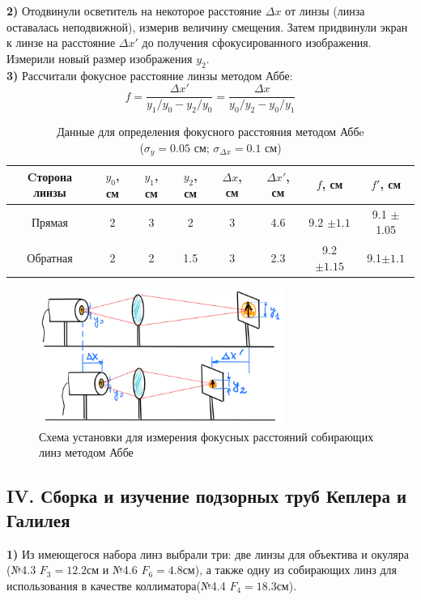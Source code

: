 \textbf{2)} Отодвинули осветитель на некоторое расстояние ${\Delta x}$ от линзы (линза оставалась неподвижной), измерив величину смещения. Затем придвинули экран к линзе на расстояние ${\Delta x'}$ до получения сфокусированного изображения. Измерили новый размер изображения ${y_2}$. \\

\textbf{3)} Рассчитали фокусное расстояние линзы методом Аббе:
\begin{equation}
    f = \frac{\Delta x'}{y_1 / y_0 - y_2 / y_0} = \frac{\Delta x}{y_0 / y_2 - y_0 / y_1}
\end{equation}

\begin{table}[h!]
    \centering
    \begin{tabular}{|c|c|c|c|c|c|c|c|}
        \hline
        Cторона линзы & $y_0$, см & $y_1$, см & $y_2$, см & $\Delta x$, см & $\Delta x'$, см & $f$, см & $f'$, см \\\hline
        Прямая   & 2 & 3 & 2   & 3 & 4.6 & 9.2 $\pm 1.1$ & 9.1 $\pm$ 1.05\\\hline
        Обратная & 2 & 2 & 1.5 & 3 & 2.3 & 9.2 $\pm 1.15$ & 9.1$\pm 1.1$ \\\hline
    \end{tabular}
    \caption{Данные для определения фокусного расстояния методом Аббe\\($\sigma_y = 0.05$ см; $\sigma_{\Delta{x}} = 0.1$ см)}
\end{table}



\begin{figure}[h!]
    \centering
    \includegraphics[width=8cm]{images/setup3.png}
    \caption{Схема установки для измерения фокусных расстояний собирающих линз методом Аббе}
\end{figure}

\subsection*{IV. Сборка и изучение подзорных труб Кеплера и Галилея}
\textbf{1)} Из имеющегося набора линз выбрали три: две линзы для объектива и окуляра (№4.3 $F_3 = 12.2 $см и №4.6 $F_6 = 4.8 $см), а также одну из собирающих линз для использования в качестве коллиматора(№4.4 $F_4 = 18.3 $см).\\

